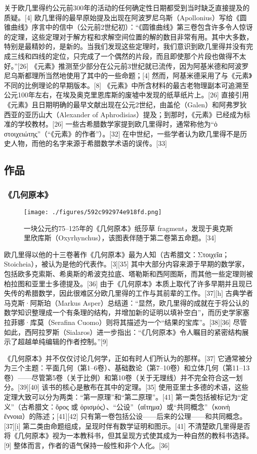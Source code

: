 关于欧几里得约公元前300年的活动的任何确定性日期都受到当时缺乏直接提及的质疑。[4] 欧几里得的最早原始提及出现在阿波罗尼乌斯（Apollonius）写给《圆锥曲线》序言中的信中（公元前2世纪初）：“《圆锥曲线》第三卷包含许多令人惊讶的定理，这些定理对于解方程和求解空间位置的解的数目非常有用。其中大多数，特别是最精妙的，是新的。当我们发现这些定理时，我们意识到欧几里得并没有完成三线和四线的定位，只完成了一个偶然的片段，而且即使那个片段也做得不太好。”[26] 《元素》推测至少部分在公元前3世纪就已流传，因为阿基米德和阿波罗尼乌斯都理所当然地使用了其中的一些命题；[4] 然而，阿基米德采用了与《元素》不同的比例理论的早期版本。[8] 《元素》中所含材料的最古老物理副本可追溯至公元100年左右，在埃及奥克里恩库斯的废墟中发现的纸草纸片上。[26] 直接引用《元素》且日期明确的最早文献出现在公元2世纪，由盖伦（Galen）和阿弗罗狄西亚的亚历山大（Alexander of Aphrodisias）提及；到那时，《元素》已经成为标准的学校教材。[26] 一些古希腊数学家提到欧几里得时，通常称他为“ὁ στοιχειώτης”（“《元素》的作者”）。[32] 在中世纪，一些学者认为欧几里得不是历史人物，而他的名字来源于希腊数学术语的误传。[33]
\subsection{作品}  
\subsubsection{《几何原本》}
\begin{figure}[ht]
\centering
\texttt{[image: ./figures/592c992974e918fd.png]}
\caption{一块公元约75–125年的《几何原本》纸莎草 fragment，发现于奥克斯里欣库斯（Oxyrhynchus），该图表伴随于第二卷第五命题。[34]} \label{fig_Euclid_4}
\end{figure}
欧几里得以他的十三卷著作《几何原本》最为人知（古希腊文：Στοιχεῖα；Stoicheia），被认为是他的代表作。[3][35] 其中大部分内容来源于早期的数学家，包括欧多克索斯、希奥斯的希波克拉底、塔勒斯和西阿图斯，而其他一些定理则被柏拉图和亚里士多德提及。[36] 由于《几何原本》本质上取代了许多早期并且现已失传的希腊数学，因此很难区分欧几里得的工作与其前辈的工作。[37][h] 古典学者马克斯·阿斯珀（Markus Asper）总结道：“显然，欧几里得的成就在于将公认的数学知识整理成一个有条理的结构，并增加新的证明以填补空白”，而历史学家塞拉菲娜·库莫（Serafina Cuomo）则将其描述为一个“结果的宝库”。[38][36] 尽管如此，西阿拉罗斯（Sialaros）进一步指出：“《几何原本》令人瞩目的紧密结构展示了超越单纯编辑的作者控制。”[9]

《几何原本》并不仅仅讨论几何学，正如有时人们所认为的那样。[37] 它通常被分为三个主题：平面几何（第1–6卷）、基础数论（第7–10卷）和立体几何（第11–13卷）——尽管第5卷（关于比例）和第10卷（关于无理线）并不完全符合这一划分。[39][40] 该书的核心是散布在其中的定理。[35] 使用亚里士多德的术语，这些定理大致可以分为两类：“第一原理”和“第二原理”。[41] 第一类包括被标记为“定义”（古希腊文：ὅρος 或 ὁρισμός）、“公设”（αἴτημα）或“共同概念”（κοινὴ ἔννοια）的陈述；[41][42] 只有第一卷包括公设——后来的公理——和共同概念。[37][i] 第二类由命题组成，呈现时伴有数学证明和图示。[41] 不清楚欧几里得是否将《几何原本》视为一本教科书，但其呈现方式使其成为一种自然的教科书选择。[9] 整体而言，作者的语气保持一般性和非个人化。[36]

